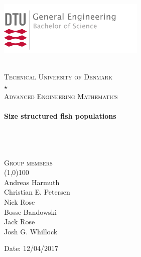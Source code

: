 \documentclass{article}
\newcommand{\mystar}{{\fontfamily{lmr}\selectfont$\star$}}
\begin{document}

\begin{titlepage}
	\begin{flushleft}
	\vspace*{-3.5cm}
	\hspace*{-3 cm}
		\includegraphics[width=7cm]{pictures/Logo.png} %
	\end{flushleft}
	\begin{center}
	\\
	[2cm]
	\textsc{\large 	Technical University of Denmark}\\
	[0.5cm]
	\textsc{\LARGE \mystar} \\
	[0.5cm]
	\textsc{\LARGE Advanced Engineering Mathematics}\\
	[2cm]
	\noindent\makebox[\linewidth]{\rule{\paperwidth}{1.5 pt}}\\
	[5mm]
	\huge{\bfseries Size structured fish populations} \\
	[0.2 cm]

	\noindent\makebox[\linewidth]{\rule{\paperwidth}{1.5 pt}}\\
	[-0.75 cm]
	\noindent\makebox[\linewidth]{\rule{\paperwidth}{0.5 pt}}\\

	\textsc{\Large}\\
	[4cm]
	\end{center}
	\begin{flushright}
	\textsc{\large Group members\\}
	\line(1,0){100}\\
	Andreas Harmuth \\
	Christian E. Petersen\\
	Nick Rose\\
	Bosse Bandowski\\
	Jack Rose\\
	Josh G. Whillock\\
	[1cm]
	\end{flushright}
	
	\begin{center}
		Date: 12/04/2017
	\end{center}
\end{titlepage}
\end{document}
